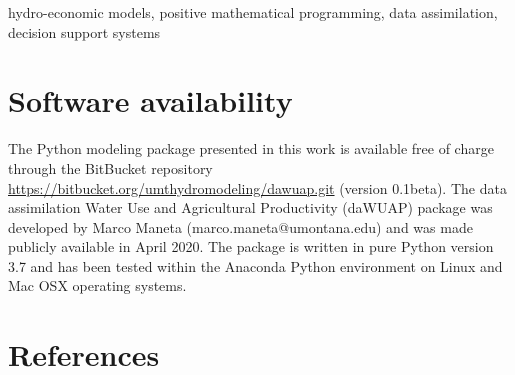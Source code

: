 \documentclass[review]{elsarticle}
\begin{document}
\begin{frontmatter}
\begin{keyword}
hydro-economic models, positive mathematical programming, data assimilation, decision support systems
\end{keyword}

\end{frontmatter}

\linenumbers

\section*{Software availability}
The Python modeling package presented in this work is available free of charge through the BitBucket repository \url{https://bitbucket.org/umthydromodeling/dawuap.git} (version 0.1beta). The data assimilation Water Use and Agricultural Productivity (daWUAP) package was developed by Marco Maneta (marco.maneta@umontana.edu) and was made publicly available in April 2020. The package is written in pure Python version 3.7 and has been tested within the Anaconda Python environment on Linux and Mac OSX operating systems.



 











\section*{References}



\appendix


\end{document}
